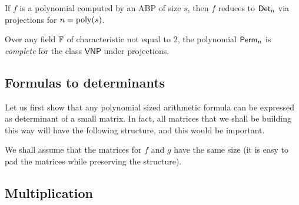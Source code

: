 \begin{theorem}[\cite{v79}]\label{thm:vp}
If $f$ is a polynomial computed by an ABP of size $s$, then $f$ reduces to $\operatorname{\mathsf{Det}}_n$ via projections for $n = \operatorname{poly}(s)$. 
\end{theorem}
\begin{theorem}[\cite{v79}]\label{thm:vnp}
Over any field $\mathbb{F}$ of characteristic not equal to $2$, the polynomial $\operatorname{\mathsf{Perm}}_n$ is \emph{complete} for the class $\mathsf{VNP}$ under projections.
\end{theorem}

\subsection{Formulas to determinants}\label{sec:formula-to-dets}

Let us first show that any polynomial sized arithmetic formula can be expressed as determinant of a small matrix.
In fact, all matrices that we shall be building this way will have the following structure, and this would be important.\\

\begin{center}
\end{center}
We shall assume that the matrices for $f$ and $g$ have the same size (it is easy to pad the matrices while preserving the structure). 

\subsection*{Multiplication}


